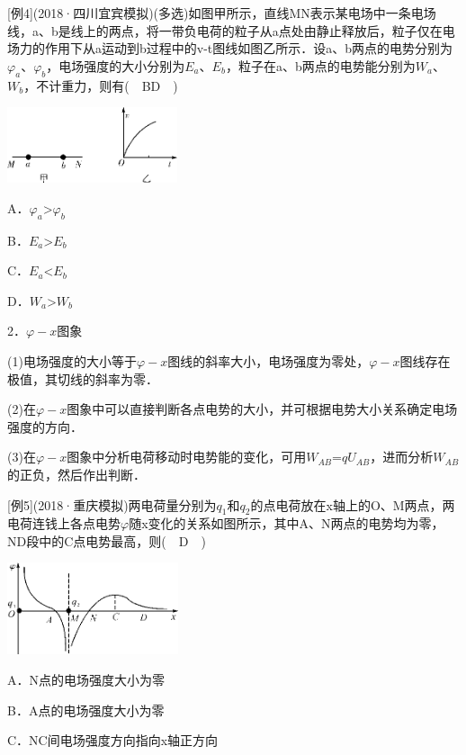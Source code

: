 \documentclass[cn,10.5pt,chinese,mac,chinesefont=founder]{elegantbook}
\begin{document}
{[}例4{]}(2018·四川宜宾模拟)(多选)如图甲所示，直线MN表示某电场中一条电场线，a、b是线上的两点，将一带负电荷的粒子从a点处由静止释放后，粒子仅在电场力的作用下从a运动到b过程中的v-t图线如图乙所示．设a、b两点的电势分别为$\varphi_a$、$\varphi_b$，电场强度的大小分别为$E_a$、$E_b$，粒子在a、b两点的电势能分别为$W_a$、$W_b$，不计重力，则有(　BD　)

\begin{center}\includegraphics[width=1.96875in,height=0.875in]{media/image284.png}\end{center}

A．$\varphi_a$\textgreater $\varphi_b$　　 

B．$E_a$\textgreater $E_b$

C．$E_a$\textless $E_b$　　 

D．$W_a$\textgreater $W_b$

2．$\varphi -x$图象

(1)电场强度的大小等于$\varphi -x$图线的斜率大小，电场强度为零处，$\varphi -x$图线存在极值，其切线的斜率为零．

(2)在$\varphi -x$图象中可以直接判断各点电势的大小，并可根据电势大小关系确定电场强度的方向．

(3)在$\varphi -x$图象中分析电荷移动时电势能的变化，可用$W_{AB}$=$qU_{AB}$，进而分析$W_{AB}$的正负，然后作出判断．

{[}例5{]}(2018·重庆模拟)两电荷量分别为$q_1$和$q_2$的点电荷放在x轴上的O、M两点，两电荷连钱上各点电势$\varphi$随x变化的关系如图所示，其中A、N两点的电势均为零，ND段中的C点电势最高，则(　D　)

\begin{center}\includegraphics[width=1.97917in,height=1.0625in]{media/image285.png}\end{center}

A．N点的电场强度大小为零

B．A点的电场强度大小为零

C．NC间电场强度方向指向x轴正方向
\end{document}
